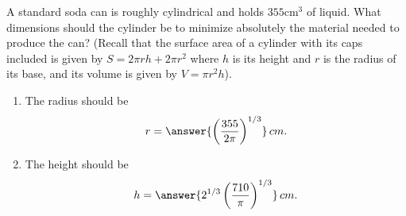 \documentclass{ximera}
\author{Gregory Hartman \and Matthew Carr}
\begin{document}
\begin{exercise}



A standard soda can is roughly cylindrical and holds $355$cm$^3$ of liquid. What dimensions should the cylinder be to minimize absolutely the material needed to produce the can? (Recall that the surface area of a cylinder with its caps included is given by $S=2\pi r h+2\pi r^2$ where $h$ is its height and $r$ is the radius of its base, and its volume is given by $V=\pi r^2 h$).
\begin{enumerate}
\item		The radius should be\[r=\answer{\left(\frac{355}{2\pi}\right)^{1/3}}\,cm.\]
\item		The height should be \[h=\answer{2^{1/3}\left(\frac{710}{\pi}\right)^{1/3}}\,cm.\]
\end{enumerate}
\end{exercise}
\end{document}
